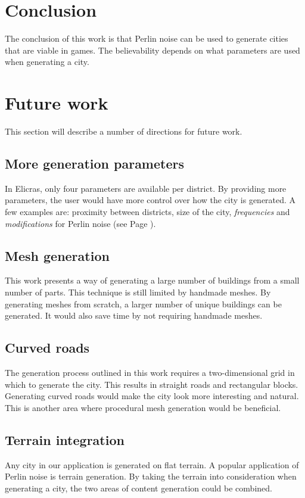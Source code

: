 \section{Conclusion}
The conclusion of this work is that Perlin noise can be used to generate cities that are viable in games. The believability depends on what parameters are used when generating a city.
	
\section{Future work}
This section will describe a number of directions for future work.
	
	\subsection{More generation parameters}
	In Elicras, only four parameters are available per district. By providing more parameters, the user would have more control over how the city is generated. A few examples are: proximity between districts, size of the city, \textit{frequencies} and \textit{modifications} for Perlin noise (see Page \pageref{fig:normal-and-modified-perlin}).
	
	\subsection{Mesh generation}
	This work presents a way of generating a large number of buildings from a small number of parts. This technique is still limited by handmade meshes. By generating meshes from scratch, a larger number of unique buildings can be generated. It would also save time by not requiring handmade meshes.
		
	\subsection{Curved roads}
	The generation process outlined in this work requires a two-dimensional grid in which to generate the city. This results in straight roads and rectangular blocks. Generating curved roads would make the city look more interesting and natural. This is another area where procedural mesh generation would be beneficial.
		
	\subsection{Terrain integration}
	Any city in our application is generated on flat terrain. A popular application of Perlin noise is terrain generation. By taking the terrain into consideration when generating a city, the two areas of content generation could be combined.